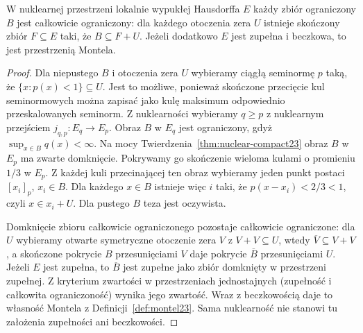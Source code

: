 \begin{stwierdzenie}
\label{prop:dt-nuclear-precompact}
W nuklearnej przestrzeni lokalnie wypukłej Hausdorffa
$E$ każdy zbiór ograniczony $B$ jest całkowicie
ograniczony: dla każdego otoczenia zera $U$ istnieje
skończony zbiór $F\subseteq E$ taki, że $B\subseteq F+U$.
Jeżeli dodatkowo $E$ jest zupełna i beczkowa, to jest
przestrzenią Montela.
\end{stwierdzenie}
\begin{proof}
Dla niepustego $B$ i otoczenia zera $U$ wybieramy
ciągłą seminormę $p$ taką, że $\{x:p(x)<1\}\subseteq U$.
Jest to możliwe, ponieważ skończone przecięcie kul
seminormowych można zapisać jako kulę maksimum
odpowiednio przeskalowanych seminorm.
Z nuklearności wybieramy $q\ge p$ z nuklearnym
przejściem $j_{q,p}:E_q\to E_p$. Obraz $B$ w $E_q$
jest ograniczony, gdyż $\sup_{x\in B}q(x)<\infty$.
Na mocy Twierdzenia~\ref{thm:nuclear-compact23}
obraz $B$ w $E_p$ ma zwarte domknięcie.
Pokrywamy go skończenie wieloma kulami o promieniu
$1/3$ w $E_p$. Z każdej kuli przecinającej ten obraz
wybieramy jeden punkt postaci $[x_i]_p$, $x_i\in B$.
Dla każdego $x\in B$ istnieje więc $i$ taki, że
$p(x-x_i)<2/3<1$, czyli $x\in x_i+U$.
Dla pustego $B$ teza jest oczywista.

Domknięcie zbioru całkowicie ograniczonego pozostaje
całkowicie ograniczone: dla $U$ wybieramy otwarte
symetryczne otoczenie zera $V$ z $V+V\subseteq U$,
wtedy $\overline V\subseteq V+V$, a skończone
pokrycie $B$ przesunięciami $V$ daje pokrycie
$\overline B$ przesunięciami $U$.
Jeżeli $E$ jest zupełna, to $\overline B$ jest zupełne
jako zbiór domknięty w przestrzeni zupełnej.
Z kryterium zwartości w przestrzeniach jednostajnych
(zupełność i całkowita ograniczoność) wynika jego
zwartość. Wraz z beczkowością daje to własność Montela
z Definicji~\ref{def:montel23}. Sama nuklearność
nie stanowi tu założenia zupełności ani beczkowości.
\end{proof}

